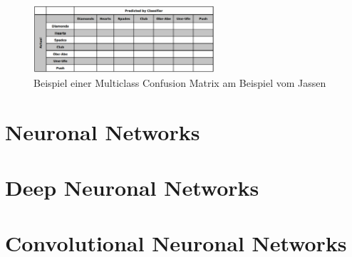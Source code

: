 \documentclass[a4paper]{article}
\begin{document}
		\begin{figure}[htb!]
			\centering
			\includegraphics[width=0.6\textwidth]{img/04_supervised_ml/multiclass_confusion_matrix.png}
			\caption{Beispiel einer Multiclass Confusion Matrix am Beispiel vom Jassen}
			\label{fig:04_superv_ml_multiclass_confusion_matrix}
		\end{figure}
	
	\section{Neuronal Networks}
	
	
	
	\section{Deep Neuronal Networks}
	
	
	
	\section{Convolutional Neuronal Networks}
	
	
\end{document}
